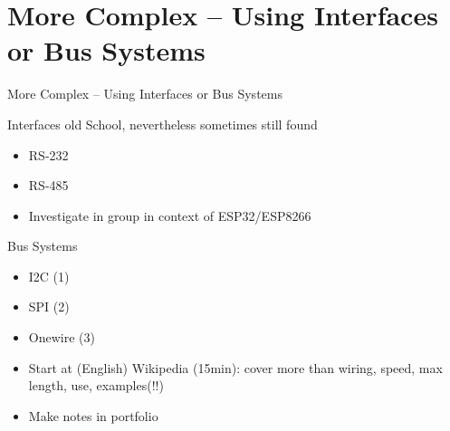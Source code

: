 ﻿\nosectionpage
\section{More Complex -- Using Interfaces or Bus Systems}
\withsectionpage

\begin{frame}{More Complex -- Using Interfaces or Bus Systems}
\begin{block}{Interfaces old School, nevertheless sometimes still found}
\begin{itemize}
\item RS-232
\item RS-485
\end{itemize}
\end{block}

\begin{itemize}
\item Investigate in group in context of ESP32/ESP8266

\end{itemize}
\begin{alertblock}{Bus Systems}
\begin{itemize}
\item I2C (1)
\item SPI (2)
\item Onewire (3)
\end{itemize}
\end{alertblock}
\begin{itemize}
\item Start at (English) Wikipedia (15min): cover more than wiring, speed, max length, use, examples(!!)
\item Make notes in portfolio
\end{itemize}
\end{frame}
